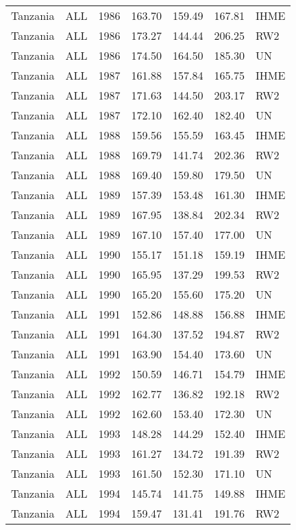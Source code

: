 \begin{longtable}{lllrrrl}
  Tanzania & ALL & 1986 & 163.70 & 159.49 & 167.81 & IHME \\ 
  Tanzania & ALL & 1986 & 173.27 & 144.44 & 206.25 & RW2 \\ 
  Tanzania & ALL & 1986 & 174.50 & 164.50 & 185.30 & UN \\ 
  Tanzania & ALL & 1987 & 161.88 & 157.84 & 165.75 & IHME \\ 
  Tanzania & ALL & 1987 & 171.63 & 144.50 & 203.17 & RW2 \\ 
  Tanzania & ALL & 1987 & 172.10 & 162.40 & 182.40 & UN \\ 
  Tanzania & ALL & 1988 & 159.56 & 155.59 & 163.45 & IHME \\ 
  Tanzania & ALL & 1988 & 169.79 & 141.74 & 202.36 & RW2 \\ 
  Tanzania & ALL & 1988 & 169.40 & 159.80 & 179.50 & UN \\ 
  Tanzania & ALL & 1989 & 157.39 & 153.48 & 161.30 & IHME \\ 
  Tanzania & ALL & 1989 & 167.95 & 138.84 & 202.34 & RW2 \\ 
  Tanzania & ALL & 1989 & 167.10 & 157.40 & 177.00 & UN \\ 
  Tanzania & ALL & 1990 & 155.17 & 151.18 & 159.19 & IHME \\ 
  Tanzania & ALL & 1990 & 165.95 & 137.29 & 199.53 & RW2 \\ 
  Tanzania & ALL & 1990 & 165.20 & 155.60 & 175.20 & UN \\ 
  Tanzania & ALL & 1991 & 152.86 & 148.88 & 156.88 & IHME \\ 
  Tanzania & ALL & 1991 & 164.30 & 137.52 & 194.87 & RW2 \\ 
  Tanzania & ALL & 1991 & 163.90 & 154.40 & 173.60 & UN \\ 
  Tanzania & ALL & 1992 & 150.59 & 146.71 & 154.79 & IHME \\ 
  Tanzania & ALL & 1992 & 162.77 & 136.82 & 192.18 & RW2 \\ 
  Tanzania & ALL & 1992 & 162.60 & 153.40 & 172.30 & UN \\ 
  Tanzania & ALL & 1993 & 148.28 & 144.29 & 152.40 & IHME \\ 
  Tanzania & ALL & 1993 & 161.27 & 134.72 & 191.39 & RW2 \\ 
  Tanzania & ALL & 1993 & 161.50 & 152.30 & 171.10 & UN \\ 
  Tanzania & ALL & 1994 & 145.74 & 141.75 & 149.88 & IHME \\ 
  Tanzania & ALL & 1994 & 159.47 & 131.41 & 191.76 & RW2 \\ 

\end{longtable}
